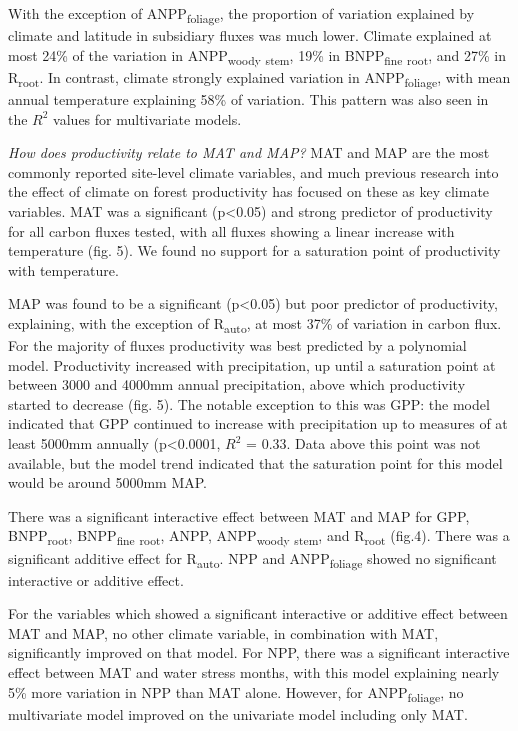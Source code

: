 \documentclass[]{article}
\begin{document}
With the exception of ANPP\textsubscript{foliage}, the proportion of
variation explained by climate and latitude in subsidiary fluxes was
much lower. Climate explained at most 24\% of the variation in
ANPP\textsubscript{woody} \textsubscript{stem}, 19\% in
BNPP\textsubscript{fine} \textsubscript{root}, and 27\% in
R\textsubscript{root}. In contrast, climate strongly explained variation
in ANPP\textsubscript{foliage}, with mean annual temperature explaining
58\% of variation. This pattern was also seen in the \(R^2\) values for
multivariate models.

\emph{How does productivity relate to MAT and MAP?} MAT and MAP are the
most commonly reported site-level climate variables, and much previous
research into the effect of climate on forest productivity has focused
on these as key climate variables. MAT was a significant
(p\textless{}0.05) and strong predictor of productivity for all carbon
fluxes tested, with all fluxes showing a linear increase with
temperature (fig. 5). We found no support for a saturation point of
productivity with temperature.

MAP was found to be a significant (p\textless{}0.05) but poor predictor
of productivity, explaining, with the exception of
R\textsubscript{auto}, at most 37\% of variation in carbon flux. For the
majority of fluxes productivity was best predicted by a polynomial
model. Productivity increased with precipitation, up until a saturation
point at between 3000 and 4000mm annual precipitation, above which
productivity started to decrease (fig. 5). The notable exception to this
was GPP: the model indicated that GPP continued to increase with
precipitation up to measures of at least 5000mm annually
(p\textless{}0.0001, \(R^2\) = 0.33. Data above this point was not
available, but the model trend indicated that the saturation point for
this model would be around 5000mm MAP.

There was a significant interactive effect between MAT and MAP for GPP,
BNPP\textsubscript{root}, BNPP\textsubscript{fine} \textsubscript{root},
ANPP, ANPP\textsubscript{woody} \textsubscript{stem}, and
R\textsubscript{root} (fig.4). There was a significant additive effect
for R\textsubscript{auto}. NPP and ANPP\textsubscript{foliage} showed no
significant interactive or additive effect.

For the variables which showed a significant interactive or additive
effect between MAT and MAP, no other climate variable, in combination
with MAT, significantly improved on that model. For NPP, there was a
significant interactive effect between MAT and water stress months, with
this model explaining nearly 5\% more variation in NPP than MAT alone.
However, for ANPP\textsubscript{foliage}, no multivariate model improved
on the univariate model including only MAT.
\end{document}

